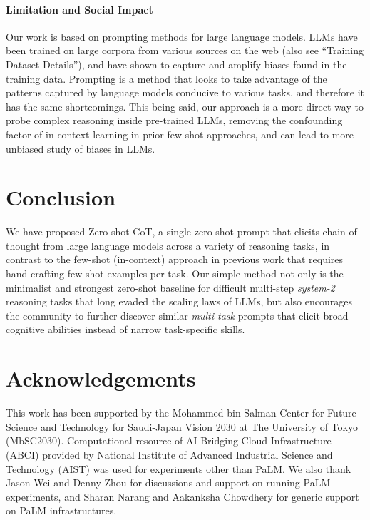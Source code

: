 \documentclass{article}
\newcommand{\CoT}{chain of thought\xspace}
\newcommand{\ours}{Zero-shot-CoT\xspace}
\begin{document}
\paragraph{Limitation and Social Impact}
 Our work is based on prompting methods for large language models. LLMs have been trained on large corpora from various sources on the web
 (also see ``Training Dataset Details''),
 and have shown to capture and amplify biases found in the training data. Prompting is a method that looks to take advantage of the patterns captured by language models conducive to various tasks, and therefore it has the same shortcomings. This being said, our approach is a more direct way to probe complex reasoning inside pre-trained LLMs, removing the confounding factor of in-context learning in prior few-shot approaches, and can lead to more unbiased study of biases in LLMs.





































 
\section{Conclusion}
We have proposed \ours,  a single zero-shot prompt that elicits \CoT from large language models across a variety of reasoning tasks, in contrast to the few-shot (in-context) approach in previous work that requires hand-crafting few-shot examples per task. 
Our simple method not only is the minimalist and strongest zero-shot baseline for difficult multi-step \textit{system-2} reasoning tasks that long evaded the scaling laws of LLMs, but also encourages the community to further discover similar \textit{multi-task} prompts that elicit broad cognitive abilities instead of narrow task-specific skills.




\section*{Acknowledgements}
This work has been supported by the Mohammed bin Salman Center for Future Science and Technology for Saudi-Japan Vision 2030 at The University of Tokyo (MbSC2030).
Computational resource of AI Bridging Cloud Infrastructure (ABCI) provided by National Institute of Advanced Industrial Science and Technology (AIST) was used for experiments other than PaLM. We also thank Jason Wei and Denny Zhou for discussions and support on running PaLM experiments, and Sharan Narang and Aakanksha Chowdhery for generic support on PaLM infrastructures.
\end{document}
